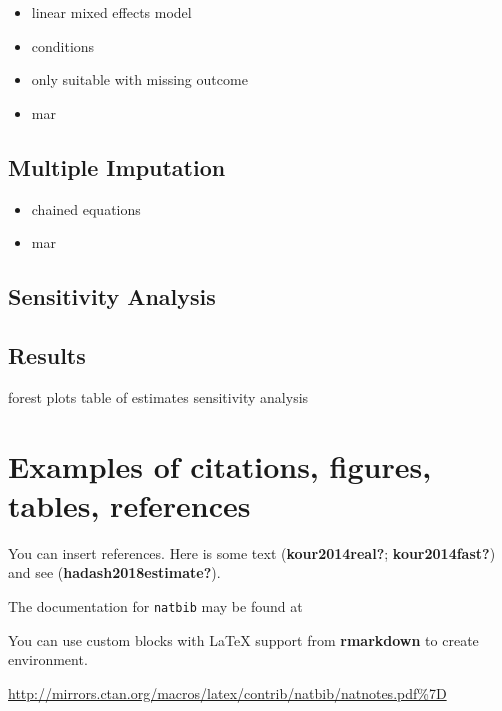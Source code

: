 \documentclass{article}
\providecommand{\tightlist}{%
  \setlength{\itemsep}{0pt}\setlength{\parskip}{0pt}}
\begin{document}
\begin{itemize}
\tightlist
\item
  linear mixed effects model
\item
  conditions
\item
  only suitable with missing outcome
\item
  mar
\end{itemize}

\subsection{Multiple Imputation}\label{multiple-imputation}

\begin{itemize}
\tightlist
\item
  chained equations
\item
  mar
\end{itemize}

\subsection{Sensitivity Analysis}\label{sensitivity-analysis}

\subsection{Results}\label{results}

forest plots table of estimates sensitivity analysis

\section{Examples of citations, figures, tables,
references}\label{examples-of-citations-figures-tables-references}

\label{sec:others}

You can insert references. Here is some text (\textbf{kour2014real?};
\textbf{kour2014fast?}) and see (\textbf{hadash2018estimate?}).

The documentation for \verb+natbib+ may be found at

You can use custom blocks with LaTeX support from \textbf{rmarkdown} to
create environment.

\begin{center}
\url{http://mirrors.ctan.org/macros/latex/contrib/natbib/natnotes.pdf\%7D}

\end{center}
\end{document}
